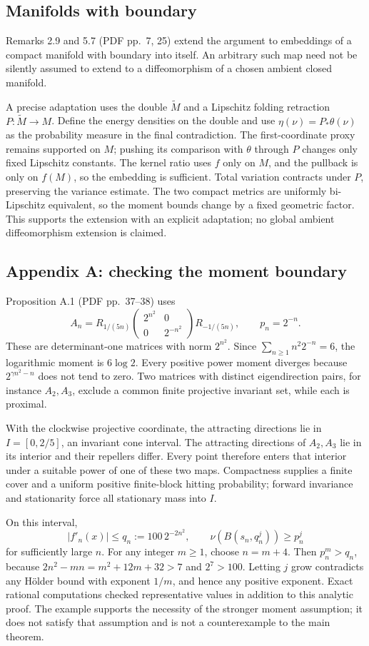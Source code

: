 \documentclass[10pt]{article}
\begin{document}
\subsection*{Manifolds with boundary}
Remarks 2.9 and 5.7 (PDF pp. 7, 25) extend the argument to embeddings of a compact manifold with boundary into itself. An arbitrary such map need not be silently assumed to extend to a diffeomorphism of a chosen ambient closed manifold.\par
A precise adaptation uses the double \(\widetilde M\) and a Lipschitz folding retraction \(P:\widetilde M\to M\). Define the energy densities on the double and use \(\eta(\nu)=P_*\theta(\nu)\) as the probability measure in the final contradiction. The first-coordinate proxy remains supported on \(M\); pushing its comparison with \(\theta\) through \(P\) changes only fixed Lipschitz constants. The kernel ratio uses \(f\) only on \(M\), and the pullback is only on \(f(M)\), so the embedding is sufficient. Total variation contracts under \(P\), preserving the variance estimate. The two compact metrics are uniformly bi-Lipschitz equivalent, so the moment bounds change by a fixed geometric factor. This supports the extension with an explicit adaptation; no global ambient diffeomorphism extension is claimed.\par
\subsection*{Appendix A: checking the moment boundary}
Proposition A.1 (PDF pp. 37–38) uses \[A_n=R_{1/(5n)}
 \begin{pmatrix}2^{n^2}&0\\0&2^{-n^2}\end{pmatrix}
 R_{-1/(5n)},\qquad p_n=2^{-n}.\] These are determinant-one matrices with norm \(2^{n^2}\). Since \(\sum_{n\ge1}n^2 2^{-n}=6\), the logarithmic moment is \(6\log2\). Every positive power moment diverges because \(2^{\gamma n^2-n}\) does not tend to zero. Two matrices with distinct eigendirection pairs, for instance \(A_2,A_3\), exclude a common finite projective invariant set, while each is proximal.\par
With the clockwise projective coordinate, the attracting directions lie in \(I=[0,2/5]\), an invariant cone interval. The attracting directions of \(A_2,A_3\) lie in its interior and their repellers differ. Every point therefore enters that interior under a suitable power of one of these two maps. Compactness supplies a finite cover and a uniform positive finite-block hitting probability; forward invariance and stationarity force all stationary mass into \(I\).\par
On this interval, \[|f'_n(x)|\le q_n:=100\,2^{-2n^2},\qquad
 \nu(B(s_n,q_n^j))\ge p_n^j\] for sufficiently large \(n\). For any integer \(m\ge1\), choose \(n=m+4\). Then \(p_n^m>q_n\), because \(2n^2-mn=m^2+12m+32>7\) and \(2^7>100\). Letting \(j\) grow contradicts any Hölder bound with exponent \(1/m\), and hence any positive exponent. Exact rational computations checked representative values in addition to this analytic proof. The example supports the necessity of the stronger moment assumption; it does not satisfy that assumption and is not a counterexample to the main theorem.\par
\end{document}

